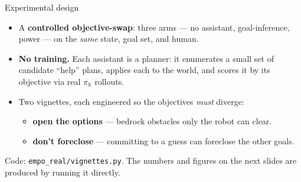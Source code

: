 \documentclass[aspectratio=169,10pt]{beamer}
\newcommand{\Power}[1]{\textcolor{cPower}{#1}}
\newcommand{\Goal}[1]{\textcolor{cGoal}{#1}}
\newcommand{\None}[1]{\textcolor{cNone}{#1}}
\begin{document}
\begin{frame}{Experimental design}
  \begin{itemize}
    \item A \textbf{controlled objective-swap}: three arms ---
      \None{no assistant}, \Goal{goal-inference}, \Power{power} --- on the
      \emph{same} state, goal set, and human.
    \item \textbf{No training.} Each assistant is a planner: it enumerates a small
      set of candidate ``help'' plans, applies each to the world, and scores it by
      its objective via real $\pi_h$ rollouts.
    \item Two vignettes, each engineered so the objectives \emph{must} diverge:
      \begin{itemize}
        \item[V1] \textbf{open the options} --- bedrock obstacles only the robot
          can clear.
        \item[V2] \textbf{don't foreclose} --- committing to a guess can foreclose
          the other goals.
      \end{itemize}
  \end{itemize}
  \vfill
  \footnotesize Code: \texttt{empo\_real/vignettes.py}. The numbers and figures on
  the next slides are produced by running it directly.
\end{frame}
\end{document}
